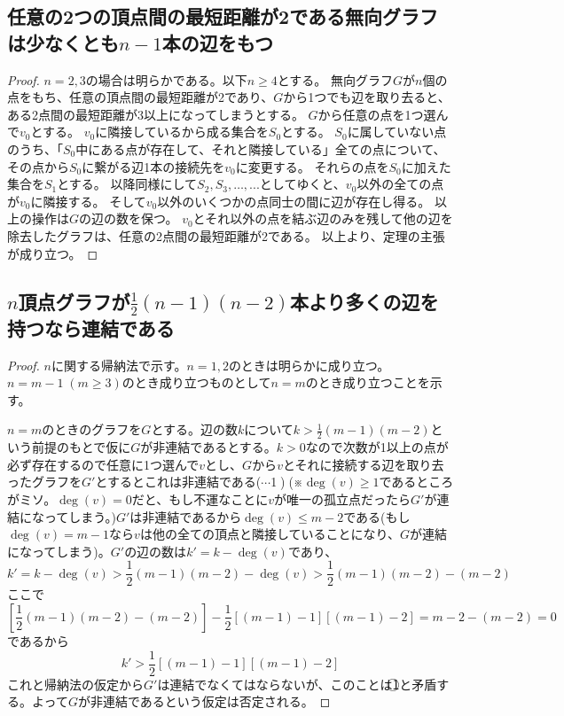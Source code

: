 			\subsection{任意の2つの頂点間の最短距離が2である無向グラフは少なくとも\texorpdfstring{$n-1$}{n-1}本の辺をもつ}
				\begin{proof}
					$n=2,3$の場合は明らかである。以下$n\geq4$とする。
					無向グラフ$G$が$n$個の点をもち、任意の頂点間の最短距離が2であり、$G$から1つでも辺を取り去ると、ある2点間の最短距離が3以上になってしまうとする。
					$G$から任意の点を1つ選んで$v_0$とする。
					$v_0$に隣接しているから成る集合を$S_0$とする。
					$S_0$に属していない点のうち、「$S_0$中にある点が存在して、それと隣接している」全ての点について、その点から$S_0$に繋がる辺1本の接続先を$v_0$に変更する。
					それらの点を$S_0$に加えた集合を$S_1$とする。
					以降同様にして$S_2,S_3,\dotsc,...$としてゆくと、$v_0$以外の全ての点が$v_0$に隣接する。
					そして$v_0$以外のいくつかの点同士の間に辺が存在し得る。
					以上の操作は$G$の辺の数を保つ。
					$v_0$とそれ以外の点を結ぶ辺のみを残して他の辺を除去したグラフは、任意の2点間の最短距離が2である。
					以上より、定理の主張が成り立つ。
				\end{proof}
			\subsection{\texorpdfstring{$n$}{n}頂点グラフが\texorpdfstring{$\frac{1}{2}(n-1)(n-2)$}{(n-1)(n-2)/2}本より多くの辺を持つなら連結である}
				\begin{proof}
					\quad\par
					$n$に関する帰納法で示す。$n=1,2$のときは明らかに成り立つ。$n=m-1\;(m\geq3)$のとき成り立つものとして$n=m$のとき成り立つことを示す。
					\par
					$n=m$のときのグラフを$G$とする。辺の数$k$について$k>\frac{1}{2}(m-1)(m-2)$という前提のもとで仮に$G$が非連結であるとする。$k>0$なので次数が1以上の点が必ず存在するので任意に1つ選んで$v$とし、$G$から$v$とそれに接続する辺を取り去ったグラフを$G'$とするとこれは非連結である($\cdots$\textcircled{1})。(※$\deg(v)\geq1$であるところがミソ。$\deg(v)=0$だと、もし不運なことに$v$が唯一の孤立点だったら$G'$が連結になってしまう。)$G'$は非連結であるから$\deg(v)\leq m-2$である(もし$\deg(v)=m-1$なら$v$は他の全ての頂点と隣接していることになり、$G$が連結になってしまう)。$G'$の辺の数は$k'=k-\deg(v)$であり、
					\[k' = k-\deg(v) > \frac{1}{2}(m-1)(m-2) - \deg(v) > \frac{1}{2}(m-1)(m-2) - (m-2)\]
					ここで
					\[\left[\frac{1}{2}(m-1)(m-2) - (m-2)\right] - \frac{1}{2}[(m-1)-1][(m-1)-2] = m-2 - (m-2) = 0\]
					であるから
					\[k' > \frac{1}{2}[(m-1)-1][(m-1)-2]\]
					これと帰納法の仮定から$G'$は連結でなくてはならないが、このことは\textcircled{1}と矛盾する。よって$G$が非連結であるという仮定は否定される。
				\end{proof}
